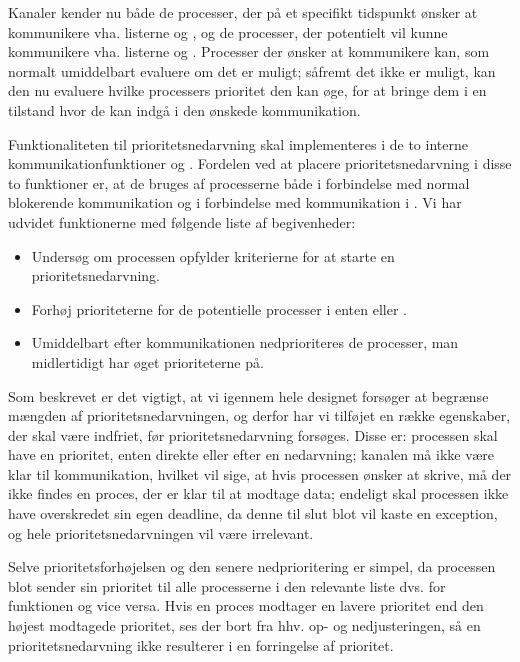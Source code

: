 Kanaler kender nu  både de processer, der på et specifikt tidspunkt ønsker at kommunikere vha. listerne  og , og de processer, der potentielt vil kunne kommunikere vha. listerne  og . Processer der ønsker at kommunikere kan, som normalt umiddelbart evaluere om det er muligt; såfremt det ikke er muligt, kan den nu evaluere hvilke processers prioritet den kan øge, for at bringe dem i en tilstand hvor de kan indgå i den ønskede kommunikation. 

Funktionaliteten til prioritetsnedarvning skal implementeres i de to interne kommunikationfunktioner   og . Fordelen ved at placere prioritetsnedarvning i disse to funktioner er, at de bruges af processerne både i forbindelse med normal blokerende kommunikation og i forbindelse med kommunikation i . Vi har udvidet funktionerne med følgende liste af begivenheder:
\begin{itemize}
\tightlist
	\item Undersøg om processen opfylder kriterierne for at starte en prioritetsnedarvning.
	\item Forhøj prioriteterne for de potentielle processer i enten  eller .
	\item Umiddelbart efter kommunikationen nedprioriteres de processer, man midlertidigt har øget prioriteterne på.
\end{itemize}

Som beskrevet er det vigtigt, at vi igennem hele designet forsøger at begrænse mængden af prioritetsnedarvningen, og derfor har vi tilføjet en række egenskaber, der skal være indfriet, før prioritetsnedarvning forsøges. Disse er: processen skal have en prioritet, enten direkte eller efter en nedarvning; kanalen må ikke være klar til kommunikation, hvilket vil sige, at hvis processen ønsker at skrive, må der ikke findes en proces, der er klar til at modtage data; endeligt skal processen ikke have overskredet sin egen deadline, da denne til slut blot vil kaste en exception, og hele prioritetsnedarvningen vil være irrelevant.

Selve prioritetsforhøjelsen og den senere nedprioritering er simpel, da processen blot sender sin prioritet til alle processerne i den relevante liste dvs.  for   funktionen og vice versa. Hvis en proces modtager en lavere prioritet end den højest modtagede prioritet, ses der bort fra hhv. op- og nedjusteringen, så en prioritetsnedarvning ikke resulterer i en forringelse af prioritet. 

